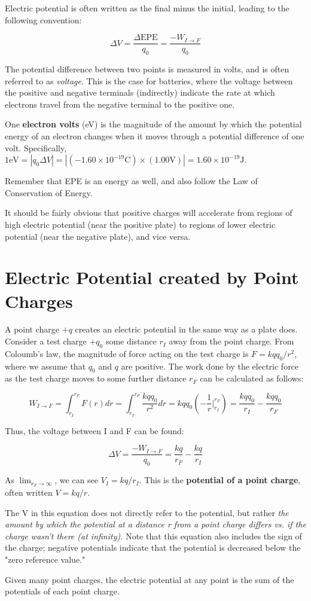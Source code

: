 \documentclass[12pt, a4paper]{article}
\theoremstyle{definition}
\begin{document}
Electric potential is often written as the final minus the initial, leading to the following convention:

\[\Delta V = \frac{\Delta \textrm{EPE}}{q_0} = \frac{-W_{I \to F}}{q_0}\]

The potential difference between two points is measured in volts, and is often referred to as \textit{voltage}.
This is the case for batteries, where the voltage between the positive and negative terminals (indirectly) indicate the rate at which electrons travel from the negative terminal to the positive one.

One \textbf{electron volts} (eV) is the magnitude of the amount by which the potential energy of an electron changes when it moves through a potential difference of one volt.
Specifically, $1 \textrm{eV} = |q_0 \Delta V| = |(-1.60 \times 10^{-19} \textrm{C}) \times (1.00 \textrm{V})| = 1.60 \times 10^{-19} \textrm{J}$.

Remember that EPE is an energy as well, and also follow the Law of Conservation of Energy.

It should be fairly obvious that positive charges will accelerate from regions of high electric potential (near the positive plate) to regions of lower electric potential (near the negative plate), and vice versa.

\section{Electric Potential created by Point Charges}
A point charge $+q$ creates an electric potential in the same way as a plate does.
Consider a test charge $+q_0$ some distance $r_I$ away from the point charge.
From Coloumb's law, the magnitude of force acting on the test charge is $F = kqq_0/r^2$, where we assume that $q_0$ and $q$ are positive.
The work done by the electric force as the test charge moves to some further distance $r_F$ can be calculated as follows:

\[W_{I \to F} = \int_{r_I}^{r_F} F(r)dr = \int_{r_I}^{r_F} \frac{kqq_0}{r^2}dr = kqq_0 (-\frac{1}{r} \Big|_{r_I}^{r_F}) = \frac{kqq_0}{r_I} - \frac{kqq_0}{r_F}\]

Thus, the voltage between I and F can be found:

\[\Delta V = \frac{-W_{I \to F}}{q_0} = \frac{kq}{r_F} - \frac{kq}{r_I}\]

As $\lim_{r_F \to \infty}$, we can see $V_I = kq/r_I$. This is the \textbf{potential of a point charge}, often written $V = kq/r$.

The V in this equation does not directly refer to the potential, but rather \textit{the amount by which the potential at a distance r from a point charge differs vs. if the charge wasn't there (at infinity).}
Note that this equation also includes the sign of the charge; negative potentials indicate that the potential is decreased below the "zero reference value."

Given many point charges, the electric potential at any point is the sum of the potentials of each point charge.
\end{document}
